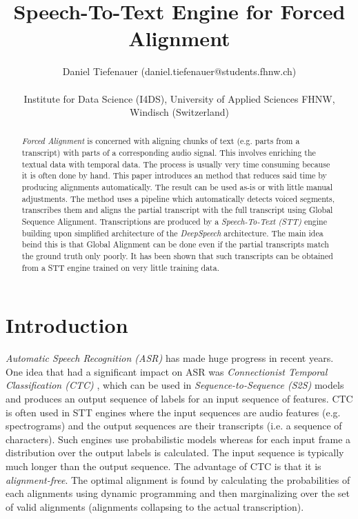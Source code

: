 \documentclass[letterpaper]{article}
\title{Speech-To-Text Engine for Forced Alignment}
\author{Daniel Tiefenauer (daniel.tiefenauer@students.fhnw.ch)\\
\mbox{}\\
Institute for Data Science (I4DS), University of Applied Sciences FHNW, Windisch (Switzerland)}
\begin{document}
	
\maketitle

\begin{abstract}
\textit{Forced Alignment} is concerned with aligning chunks of text (e.g. parts from a transcript) with parts of a corresponding audio signal. This involves enriching the textual data with temporal data. The process is usually very time consuming because it is often done by hand. This paper introduces an method that reduces said time by producing alignments automatically. The result can be used as-is or with little manual adjustments. The method uses a pipeline which automatically detects voiced segments, transcribes them and aligns the partial transcript with the full transcript using Global Sequence Alignment. Transcriptions are produced by a \textit{Speech-To-Text (STT)} engine building upon simplified architecture of the \textit{DeepSpeech} architecture. The main idea beind this is that Global Alignment can be done even if the partial transcripts match the ground truth only poorly. It has been shown that such transcripts can be obtained from a STT engine trained on very little training data.
\end{abstract}

\section{Introduction}
\textit{Automatic Speech Recognition (ASR)} has made huge progress in recent years. One idea that had a significant impact on ASR was \textit{Connectionist Temporal Classification (CTC)} \parencite{ctc_paper}, which can be used in \textit{Sequence-to-Sequence (S2S)} models and produces an output sequence of labels for an input sequence of features. CTC is often used in STT engines where the input sequences are audio features (e.g. spectrograms) and the output sequences are their transcripts (i.e. a sequence of characters). Such engines use probabilistic models whereas for each input frame a distribution over the output labels is calculated. The input sequence is typically much longer than the output sequence. The advantage of CTC is that it is \textit{alignment-free}. The optimal alignment is found by calculating the probabilities of each alignments using dynamic programming and then marginalizing over the set of valid alignments (alignments collapsing to the actual transcription). 
\end{document}
